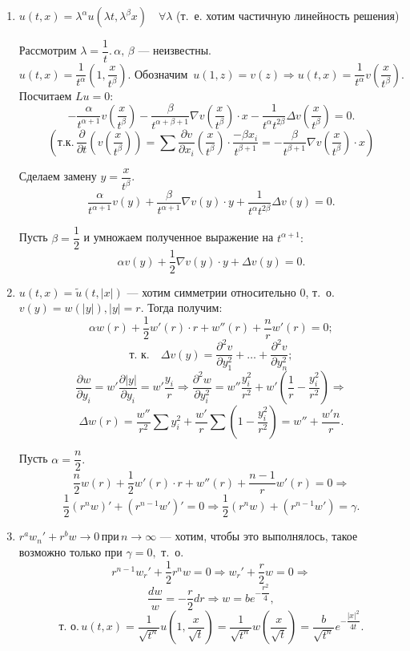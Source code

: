 \begin{enumerate}
\item $u(t,x) = \lambda^\alpha u(\lambda t, \lambda^\beta x) \quad \forall \lambda$ (т.~е. хотим частичную линейность решения)

Рассмотрим $\lambda = \dfrac{1} {t}. \, \alpha, \, \beta$ --- неизвестны.
$$u(t,x) = \dfrac{1}{t^\alpha}(1, \dfrac{x}{t^\beta}) \text{. Обозначим } \, u(1,z) = v(z) \Rightarrow u(t,x) = \dfrac{1}{t^\alpha} v(\dfrac{x}{t^\beta}).$$
Посчитаем $Lu = 0$:
$$-\dfrac{\alpha}{t^{\alpha + 1}} v\left( \dfrac{x}{t^\beta}\right) - \dfrac{\beta}{t^{\alpha + \beta + 1}}\nabla v\left( \dfrac{x}{t^\beta}\right)\cdot x - \dfrac{1}{t^\alpha t^{2\beta}}\Delta v\left( \dfrac{x}{t^\beta}\right) = 0.$$
$$\left(\text{т.к.} \, \dfrac{\partial}{\partial t} \left(v\left( \dfrac{x}{t^\beta}\right)\right) = \sum \dfrac{ \partial v}{\partial x_i}\left(\dfrac{x}{t^\beta}\right) \cdot \dfrac{-\beta x_i}{t^{\beta + 1}} = -\dfrac{\beta}{t^{\beta + 1}}\nabla v\left( \dfrac{x}{t^\beta}\right) \cdot x \right)$$

Сделаем замену $ y = \dfrac{x} {t^\beta}.$
$$ \dfrac{\alpha}{t^{\alpha + 1}} v(y) + \dfrac{\beta}{t^{\alpha + 1}} \nabla v(y) \cdot y + \dfrac{1}{t^\alpha  t^{2\beta}}\Delta v(y)=0.$$

Пусть $\beta = \dfrac{1}{2}$ и умножаем полученное выражение на $t^{\alpha + 1}:$
$$\alpha v(y) + \dfrac{1}{2} \nabla v(y) \cdot y + \Delta v(y) = 0.$$

\item $u(t,x) = \tilde{u}(t,|x|)$ --- хотим симметрии относительно 0, т.~о. $v(y) = w(|y|), |y| = r.$ Тогда получим:
$$ \alpha w(r) + \dfrac{1}{2} w'(r) \cdot r + w''(r) + \dfrac{n}{r}w'(r) = 0;$$
$$\text{т.~к.} \quad \Delta v(y) = \dfrac{\partial^2v}{\partial y_1^2} + \dots + \dfrac{\partial^2v}{\partial y_n^2};$$
$$\dfrac{\partial w}{\partial y_i} = w' \dfrac{\partial |y|}{\partial y_i} = w' \dfrac{y_i}{r} \Rightarrow 
\dfrac{\partial^2 w}{\partial y_i^2} = w''\dfrac{y_i^2}{r^2} + w'\left(\dfrac{1}{r} - \dfrac{y_i^2}{r^2}\right) \Rightarrow$$
$$\Delta w(r) = \dfrac{w''}{r^2}\sum y_i^2 + \dfrac{w'}{r}\sum (1 - \dfrac{y_i^2}{r^2}) = w'' + \dfrac{w'n}{r}.$$

Пусть $\alpha = \dfrac{n}{2}.$
$$\dfrac{n}{2}w(r) + \dfrac{1}{2}w'(r) \cdot r + w''(r) + \dfrac{n-1}{r}w'(r) = 0 \Rightarrow$$$$ \dfrac{1}{2}\left(r^nw\right)' + \left(r^{n-1}w'\right)' = 0 \Rightarrow \dfrac{1}{2}\left(r^nw\right)+ \left(r^{n-1}w'\right) = \gamma.$$

\item $r^aw_n' + r^bw \rightarrow 0 \, \text{при} \, n \rightarrow \infty$ --- хотим, чтобы это выполнялось, такое возможно только при $\gamma = 0,$ т.~о.
$$r^{n-1}w_r' + \dfrac{1}{2}r^nw = 0 \Rightarrow w_r' + \dfrac{r}{2}w = 0 \Rightarrow$$
$$\dfrac{dw}{w} = -\dfrac{r}{2}dr \Rightarrow w = be^{-\dfrac{r^2}{4}},$$
$$\text{т.~о.} \, u(t,x) = \dfrac{1}{\sqrt{t^n}}u\left(1, \dfrac{x}{\sqrt{t}}\right) = \dfrac{1}{\sqrt{t^n}}w\left(\dfrac{x}{\sqrt{t}}\right) = \dfrac{b}{\sqrt{t^n}}e^{-\dfrac{|x|^2}{4t}}.$$


\end{enumerate}
